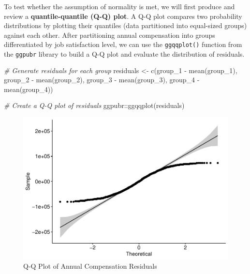 \documentclass[
]{book}
\newenvironment{Shaded}{\begin{snugshade}}{\end{snugshade}}
\newcommand{\CommentTok}[1]{\textcolor[rgb]{0.56,0.35,0.01}{\textit{#1}}}
\newcommand{\FunctionTok}[1]{\textcolor[rgb]{0.00,0.00,0.00}{#1}}
\newcommand{\NormalTok}[1]{#1}
\newcommand{\OtherTok}[1]{\textcolor[rgb]{0.56,0.35,0.01}{#1}}
\newcommand{\SpecialCharTok}[1]{\textcolor[rgb]{0.00,0.00,0.00}{#1}}
\begin{document}
To test whether the assumption of normality is met, we will first produce and review a \textbf{quantile-quantile (Q-Q) plot}. A Q-Q plot compares two probability distributions by plotting their quantiles (data partitioned into equal-sized groups) against each other. After partitioning annual compensation into groups differentiated by job satisfaction level, we can use the \texttt{ggqqplot()} function from the \texttt{ggpubr} library to build a Q-Q plot and evaluate the distribution of residuals.

\begin{Shaded}
\begin{Highlighting}[]
\CommentTok{\# Generate residuals for each group}
\NormalTok{residuals }\OtherTok{\textless{}{-}} \FunctionTok{c}\NormalTok{(group\_1 }\SpecialCharTok{{-}} \FunctionTok{mean}\NormalTok{(group\_1), group\_2 }\SpecialCharTok{{-}} \FunctionTok{mean}\NormalTok{(group\_2), group\_3 }\SpecialCharTok{{-}} \FunctionTok{mean}\NormalTok{(group\_3), group\_4 }\SpecialCharTok{{-}} \FunctionTok{mean}\NormalTok{(group\_4))}

\CommentTok{\# Create a Q{-}Q plot of residuals}
\NormalTok{ggpubr}\SpecialCharTok{::}\FunctionTok{ggqqplot}\NormalTok{(residuals)}
\end{Highlighting}
\end{Shaded}

\begin{figure}

{\centering \includegraphics{People_Analytics_Lifecycle_files/figure-latex/qq-plot-1} 

}

\caption{Q-Q Plot of Annual Compensation Residuals}\label{fig:qq-plot}
\end{figure}
\end{document}
